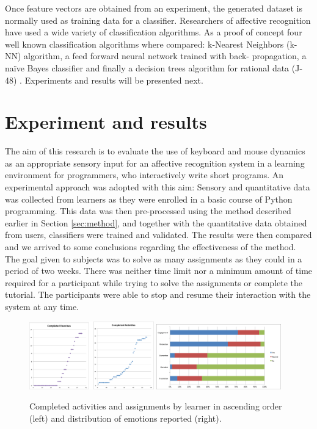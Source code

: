 \documentclass[a4paper,twoside]{article}
\begin{document}
Once feature vectors are obtained from an experiment, the generated dataset is
normally used as training data for a classifier. Researchers of affective
recognition have used a wide variety of classification algorithms. As a proof of
concept four well known classification algorithms where compared: k-Nearest
Neighbors (k-NN) algorithm, a feed forward neural network trained with back-
propagation, a na\"ive Bayes classifier and finally a decision trees algorithm for
rational data (J-48) \cite{tan2006introduction}. Experiments and results will be presented next.

\section{Experiment and results}
\label{sec:exp}
The aim of this research is to evaluate the use of keyboard
and mouse dynamics as an appropriate sensory input for an affective recognition
system in a learning environment for programmers,
who interactively write short programs. An experimental approach was adopted with this aim: Sensory and
quantitative data was collected from learners as they were enrolled in a basic
course of Python programming. This data was then pre-processed using the method
described earlier in Section \ref{sec:method}, and together with the quantitative data obtained from users,
classifiers were trained and validated. The results were then compared
and we arrived to some conclusions regarding the effectiveness of the method. The goal given to
subjects was to solve as many assignments as they could in a period of two weeks.
There was neither time limit nor a minimum amount of time required for a
participant while trying to solve the assignments or complete the tutorial. The
participants were able to stop and resume their interaction with the system at
any time.
%
\begin{figure}[!t]
\centering
\includegraphics[width=0.48\textwidth]{Completed.png}
\includegraphics[width=0.48\textwidth]{classDist.png}
\caption{Completed activities and assignments by learner in ascending order (left) and distribution of emotions reported (right).}
\label{fig_completed}
\end{figure}
\end{document}
